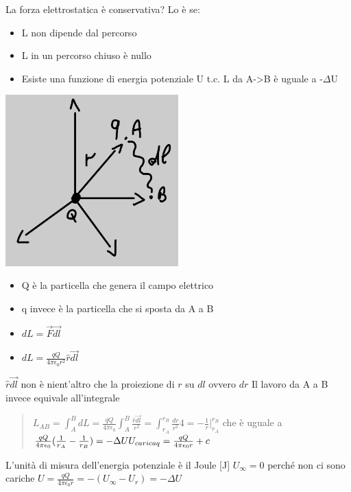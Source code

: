\documentclass{book}
\begin{document}
La forza elettrostatica è conservativa? Lo è se:
\begin{itemize}
    \item L non dipende dal percorso
    \item L in un percorso chiuso è nullo
    \item Esiste una funzione di energia potenziale U t.c. L da A->B è uguale a -$\Delta$U
\end{itemize}
\begin{center}
    \includegraphics[width=0.5\textwidth]{energia_elettrostatica_1.jpg}
\end{center}
\begin{itemize}
    \item Q è la particella che genera il campo elettrico
    \item q invece è la particella che si sposta da A a B
    \item $dL = \vec{F}\vec{dl}$
    \item $dL = \frac{qQ}{4\pi\epsilon_0r^2}\hat{r}\vec{dl}$
\end{itemize}
$\hat{r}\vec{dl}$ non è nient'altro che la proiezione di $r$ su $dl$ ovvero $dr$
\newline Il lavoro da A a B invece equivale all'integrale
\begin{quote}
    \begin{math}
        L_{AB} = \int^B_A dL = \frac{qQ}{4\pi\epsilon_0} \int^B_A \frac{\hat{r}\vec{dl}}{r^2} = \int^{r_B}_{r_A} \frac{dr}{r^2} 4
        = -\frac{1}{r}|^{r_B}_{r_A}
    \end{math}
    che è uguale a 
    \begin{math}
        \frac{qQ}{4\pi\epsilon_0}(\frac{1}{r_A}-\frac{1}{r_B}) = -\Delta U\\
        \newline U_{carica q} = \frac{qQ}{4\pi\epsilon_0r}+c
    \end{math}
\end{quote}
L'unità di misura dell'energia potenziale è il Joule [J]
\newline $U_\infty = 0$ perché non ci sono cariche
\newline $U = \frac{qQ}{4\pi\epsilon_0r} = -(U_\infty-U_r) = -\Delta U$
\end{document}

